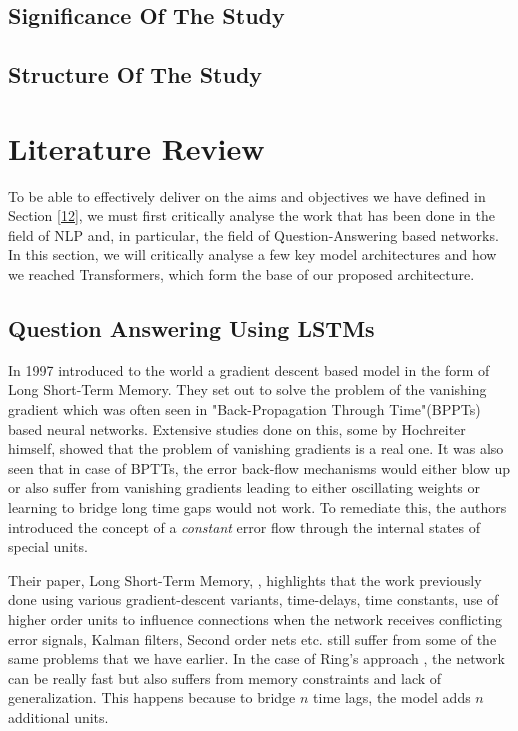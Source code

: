 \documentclass[12pt]{report}
\begin{document}
        \section{Significance Of The Study}\label{14}
        \section{Structure Of The Study}\label{15}
    \chapter{\centering Literature Review}\label{c2}

    To be able to effectively deliver on the aims and objectives we have defined in Section \ref{12}, we must first critically analyse the work that has been done in the field of NLP and, in particular, the field of Question-Answering based networks. In this section, we will critically analyse a few key model architectures and how we reached Transformers, which form the base of our proposed architecture.


        \section{Question Answering Using LSTMs}\label{22}

            In 1997 \cite{lstmoriginal} introduced to the world a gradient descent based model in the form of Long Short-Term Memory. They set out to solve the problem of the vanishing gradient which was often seen in "Back-Propagation Through Time"(BPPTs) based neural networks. Extensive studies done on this, some by Hochreiter himself, showed that the problem of vanishing gradients is a real one. It was also seen that in case of BPTTs, the error back-flow mechanisms would either blow up or also suffer from vanishing gradients leading to either oscillating weights or learning to bridge long time gaps would not work. To remediate this, the authors introduced the concept of a \textit{constant} error flow through the internal states of special units.

            Their paper, Long Short-Term Memory, \citep{lstmoriginal}, highlights that the work previously done using various gradient-descent variants, time-delays, time constants, use of higher order units to influence connections when the network receives conflicting error signals, Kalman filters, Second order nets etc. still suffer from some of the same problems that we have earlier. In the case of Ring's approach \citep{lstmRing}, the network can be really fast but also suffers from memory constraints and lack of generalization. This happens because to bridge $ n $ time lags, the model adds $ n $ additional units.
\end{document}
